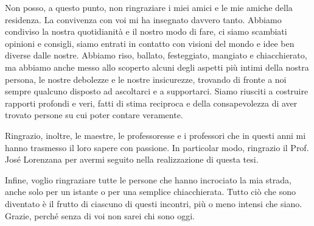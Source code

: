 \documentclass[english,binding=0.6cm,noexaminfo]{sapthesis}
\begin{document}
\begin{acknowledgments}
Non posso, a questo punto, non ringraziare i miei amici e le mie amiche della residenza. La convivenza con voi mi ha insegnato davvero tanto. Abbiamo condiviso la nostra quotidianità e il nostro modo di fare, ci siamo scambiati opinioni e consigli, siamo entrati in contatto con visioni del mondo e idee ben diverse dalle nostre. Abbiamo riso, ballato, festeggiato, mangiato e chiacchierato, ma abbiamo anche messo allo scoperto alcuni degli aspetti più intimi della nostra persona, le nostre debolezze e le nostre insicurezze, trovando di fronte a noi sempre qualcuno disposto ad ascoltarci e a supportarci. Siamo riusciti a costruire rapporti profondi e veri, fatti di stima reciproca e della consapevolezza di aver trovato persone su cui poter contare veramente.

Ringrazio, inoltre, le maestre, le professoresse e i professori che in questi anni mi hanno trasmesso il loro sapere con passione. In particolar modo, ringrazio il Prof. José Lorenzana per avermi seguito nella realizzazione di questa tesi.

Infine, voglio ringraziare tutte le persone che hanno incrociato la mia strada, anche solo per un istante o per una semplice chiacchierata. Tutto ciò che sono diventato è il frutto di ciascuno di questi incontri, più o meno intensi che siano. Grazie, perché senza di voi non sarei chi sono oggi.





\end{acknowledgments}
\end{document}

